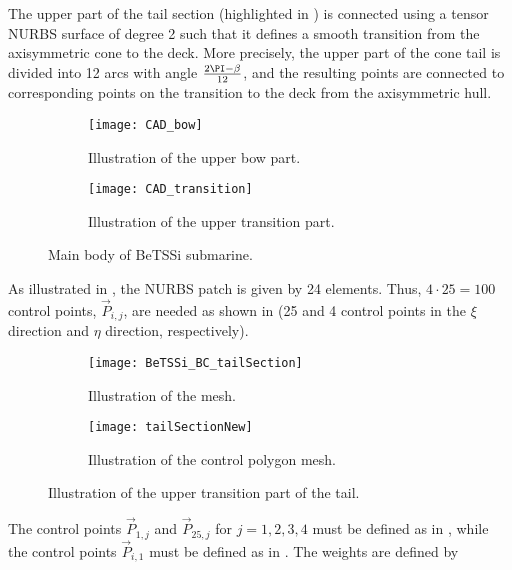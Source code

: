 The upper part of the tail section (highlighted in ) is connected using a tensor NURBS surface of degree 2 such that it defines a smooth transition from the axisymmetric cone to the deck. More precisely, the upper part of the cone tail is divided into 12 arcs with angle $\frac{2\PI-\beta}{12}$, and the resulting points are connected to corresponding points on the transition to the deck from the axisymmetric hull. 
\begin{figure}
	\centering    
	\begin{subfigure}{0.49\textwidth}
		\centering
		\texttt{[image: CAD\_bow]}
		\caption{Illustration of the upper bow part.}
		\label{Fig3:bettsi_upperBow}
	\end{subfigure}%
	\hspace*{0.02\textwidth}%
	\begin{subfigure}{0.49\textwidth}
		\centering
		\texttt{[image: CAD\_transition]}
		\caption{Illustration of the upper transition part.}
		\label{Fig3:bettsi_upperPartOfTailSection}
	\end{subfigure}
	\caption{Main body of BeTSSi submarine.}
\end{figure}
As illustrated in , the NURBS patch is given by 24 elements. Thus, $4\cdot 25 = 100$ control points, $\vec{P}_{i,j}$, are needed as shown in  (25 and 4 control points in the $\xi$ direction and $\eta$ direction, respectively).
\begin{figure}
	\centering    
	\begin{subfigure}{0.49\textwidth}
		\centering
		\texttt{[image: BeTSSi\_BC\_tailSection]}
		\caption{Illustration of the mesh.}
		\label{Fig3:BeTSSi_BC_tailSection}
	\end{subfigure}%
	\hspace*{0.02\textwidth}%
	\begin{subfigure}{0.49\textwidth}
		\centering
		\texttt{[image: tailSectionNew]}
		\caption{Illustration of the control polygon mesh.}
		\label{Fig3:BeTSSi_BC_tailSection_cp}
	\end{subfigure}
	\caption{Illustration of the upper transition part of the tail.}
\end{figure}
The control points $\vec{P}_{1,j}$ and $\vec{P}_{25,j}$ for $j=1,2,3,4$ must be defined as in , while the control points $\vec{P}_{i,1}$ must be defined as in . The weights are defined by
